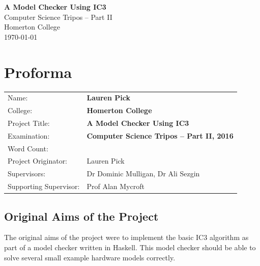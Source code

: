 \documentclass[12pt,a4paper,twoside,openright]{report}
\begin{document}






\pagestyle{empty}


\vspace*{60mm}
\begin{center}
\Huge
\textbf{A Model Checker Using IC3} \\[5mm]
Computer Science Tripos -- Part II \\[5mm]
Homerton College \\[5mm]
\today  %
\end{center}


\pagestyle{plain}

\chapter*{Proforma}

{\large
\begin{tabular}{ll}
Name:                  & \bf Lauren Pick                           \\
College:               & \bf Homerton College                      \\
Project Title:         & \bf A Model Checker Using IC3             \\
Examination:        & \bf Computer Science Tripos -- Part II, 2016 \\
Word Count:            & \bf                                       \\
Project Originator:    & Lauren Pick                               \\
Supervisors:           & Dr Dominic Mulligan, Dr Ali Sezgin        \\ 
Supporting Supervisor: & Prof Alan Mycroft
\end{tabular}
}


\section*{Original Aims of the Project}

The original aims of the project were to implement the basic
IC3 algorithm as part of a model checker written in Haskell.
This model checker should be able to
solve several small example hardware models correctly.
\end{document}
